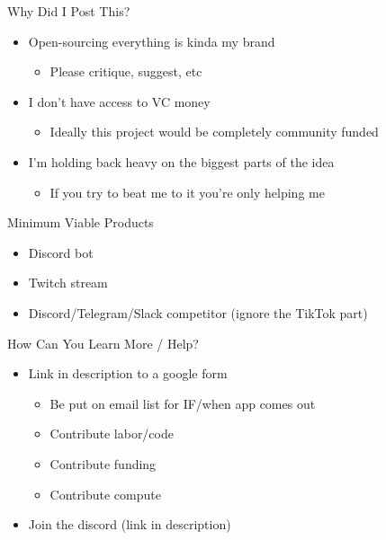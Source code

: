 \documentclass[aspectratio=169]{beamer}
\begin{document}
\begin{frame}{Why Did I Post This?}
\vspace{-0.9in}
\begin{itemize}
    \item Open-sourcing everything is kinda my brand
    \begin{itemize}
        \item Please critique, suggest, etc
    \end{itemize}
    \item I don't have access to VC money
    \begin{itemize}
        \item Ideally this project would be completely community funded
    \end{itemize}
    \item I'm holding back heavy on the biggest parts of the idea
    \begin{itemize}
        \item If you try to beat me to it you're only helping me
    \end{itemize}
\end{itemize}
\end{frame}

\begin{frame}{Minimum Viable Products}
\vspace{-0.9in}
\begin{itemize}
    \item Discord bot
    \item Twitch stream
    \item Discord/Telegram/Slack competitor (ignore the TikTok part)
\end{itemize}
\end{frame}

\begin{frame}{How Can You Learn More / Help?}
\vspace{-0.9in}
\begin{itemize}
    \item Link in description to a google form
    \begin{itemize}
        \item Be put on email list for IF/when app comes out
        \item Contribute labor/code
        \item Contribute funding
        \item Contribute compute
    \end{itemize}
    \item Join the discord (link in description)
\end{itemize}
\end{frame}
\end{document}
